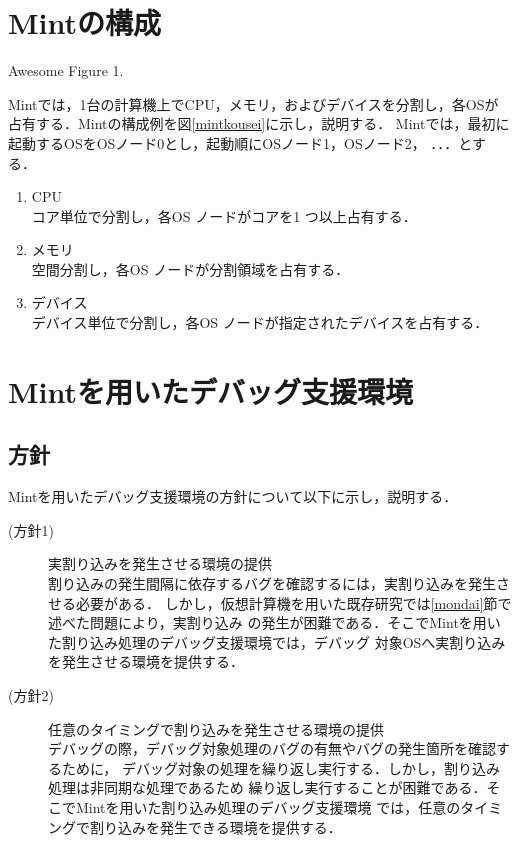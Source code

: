 \documentclass[tanilab-enum]{graduate}
\begin{document}
\section{Mintの構成}
{Awesome Figure 1.}

Mintでは，1台の計算機上でCPU，メモリ，およびデバイスを分割し，各OSが
占有する．Mintの構成例を図\ref{mintkousei}に示し，説明する．
Mintでは，最初に起動するOSをOSノード0とし，起動順にOSノード1，OSノード2，
．．．とする．
\begin{enumerate}
    \item CPU\\
        コア単位で分割し，各OS ノードがコアを1 つ以上占有する．
    \item メモリ\\
        空間分割し，各OS ノードが分割領域を占有する．
    \item デバイス\\
        デバイス単位で分割し，各OS ノードが指定されたデバイスを占有する．
\end{enumerate}
\section{Mintを用いたデバッグ支援環境}
\subsection{方針}
Mintを用いたデバッグ支援環境の方針について以下に示し，説明する．
\begin{description}
    \item[(方針1)]実割り込みを発生させる環境の提供\\
        割り込みの発生間隔に依存するバグを確認するには，実割り込みを発生させる必要がある．
        しかし，仮想計算機を用いた既存研究では\ref{mondai}節で述べた問題により，実割り込み
        の発生が困難である．そこでMintを用いた割り込み処理のデバッグ支援環境では，デバッグ
        対象OSへ実割り込みを発生させる環境を提供する．
    \item[(方針2)]任意のタイミングで割り込みを発生させる環境の提供\\
        デバッグの際，デバッグ対象処理のバグの有無やバグの発生箇所を確認するために，
        デバッグ対象の処理を繰り返し実行する．しかし，割り込み処理は非同期な処理であるため
        繰り返し実行することが困難である．そこでMintを用いた割り込み処理のデバッグ支援環境
        では，任意のタイミングで割り込みを発生できる環境を提供する．
\end{description}
\end{document}
